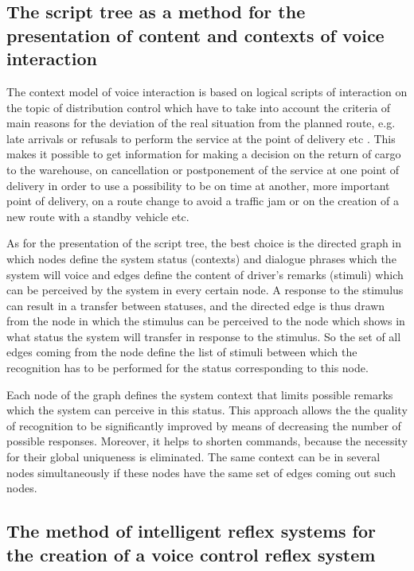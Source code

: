 \subsection{The script tree as a method for the presentation of content and contexts of voice interaction}

The context model of voice interaction is based on logical scripts of interaction on the topic of distribution control which have to take into account the criteria of main reasons for the deviation of the real situation from the planned route, e.g. late arrivals or refusals to perform the service at the point of delivery etc \cite{art3}. This makes it possible to get information for making a decision on the return of cargo to the warehouse, on cancellation or postponement of the service at one point of delivery in order to use a possibility to be on time at another, more important point of delivery, on a route change to avoid a traffic jam or on the creation of a new route with a standby vehicle etc. 

As for the presentation of the script tree, the best choice is the directed graph in which nodes define the system status (contexts) and dialogue phrases which the system will voice and edges define the content of driver’s remarks (stimuli) which can be perceived by the system in every certain node. A response to the stimulus can result in a transfer between statuses, and the directed edge is thus drawn from the node in which the stimulus can be perceived to the node which shows in what status the system will transfer in response to the stimulus. So the set of all edges coming from the node define the list of stimuli between which the recognition has to be performed for the status corresponding to this node. 

Each node of the graph defines the system context that limits possible remarks which the system can perceive in this status. This approach allows the the quality of recognition to be significantly improved by means of decreasing the number of possible responses. Moreover, it helps to shorten commands, because the necessity for their global uniqueness is eliminated. The same context can be in several nodes simultaneously if these nodes have the same set of edges coming out such nodes. 

\subsection{The method of intelligent reflex systems for the creation of a voice control reflex system} 

